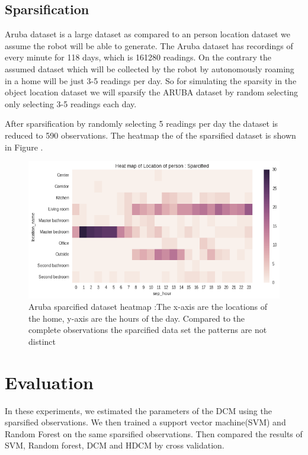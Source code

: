 \subsection*{Sparsification}
Aruba dataset is a large dataset as compared to an person location dataset we assume the robot will be able to generate. The Aruba dataset has recordings of every minute for 118 days, which is 161280 readings.
On the contrary the assumed dataset which will be collected by the robot by autonomously roaming in a home will be just 3-5 readings per day.
So for simulating the sparsity in the object location dataset we will sparsify the ARUBA dataset by random selecting only selecting 3-5 readings each day.

After sparsification by randomly selecting 5 readings per day the dataset is reduced to 590 observations. The heatmap the of the sparsified dataset is shown in Figure \cite{aruba-reduced-hist}. 

\begin{figure}[htp]
\centering
\includegraphics[width=\textwidth]{images/aruba-reduced-heatmap.png}
\caption[Aruba sparcified dataset heatmap]{Aruba sparcified dataset heatmap :The x-axis are the locations of the home, y-axis are the hours of the day. Compared to the complete observations the sparcified data set the patterns are not distinct}
\label{aruba-reduced-hist}
\end{figure}

\FloatBarrier

\section{Evaluation}

In these experiments, we estimated the parameters of the DCM using the sparsified observations. We then trained a support vector machine(SVM) and Random Forest on the same sparsified observations. Then compared the results of SVM, Random forest, DCM and HDCM by cross validation.



